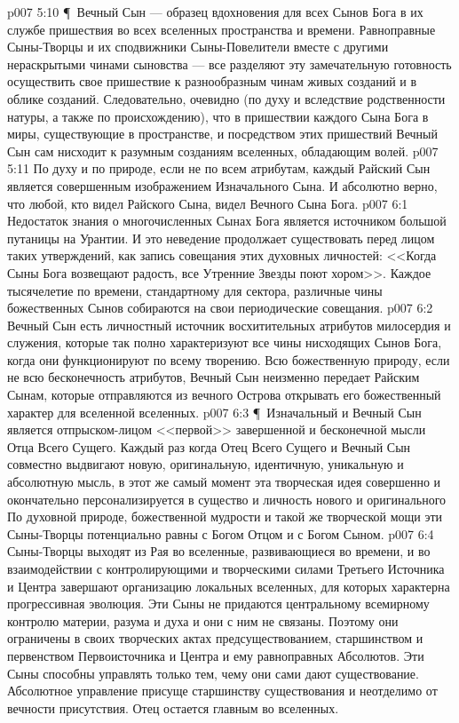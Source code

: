 \vs p007 5:10 \P\ Вечный Сын --- образец вдохновения для всех Сынов Бога в их службе пришествия во всех вселенных пространства и времени. Равноправные Сыны\hyp{}Творцы и их сподвижники Сыны\hyp{}Повелители вместе с другими нераскрытыми чинами сыновства --- все разделяют эту замечательную готовность осуществить свое пришествие к разнообразным чинам живых созданий и в облике созданий. Следовательно, очевидно (по духу и вследствие родственности натуры, а также по происхождению), что в пришествии каждого Сына Бога в миры, существующие в пространстве, и посредством этих пришествий Вечный Сын сам нисходит к разумным созданиям вселенных, обладающим волей.
\vs p007 5:11 По духу и по природе, если не по всем атрибутам, каждый Райский Сын является совершенным изображением Изначального Сына. И абсолютно верно, что любой, кто видел Райского Сына, видел Вечного Сына Бога.
\vs p007 6:1 Недостаток знания о многочисленных Сынах Бога является источником большой путаницы на Урантии. И это неведение продолжает существовать перед лицом таких утверждений, как запись совещания этих духовных личностей: <<Когда Сыны Бога возвещают радость, все Утренние Звезды поют хором>>. Каждое тысячелетие по времени, стандартному для сектора, различные чины божественных Сынов собираются на свои периодические совещания.
\vs p007 6:2 Вечный Сын есть личностный источник восхитительных атрибутов милосердия и служения, которые так полно характеризуют все чины нисходящих Сынов Бога, когда они функционируют по всему творению. Всю божественную природу, если не всю бесконечность атрибутов, Вечный Сын неизменно передает Райским Сынам, которые отправляются из вечного Острова открывать его божественный характер для вселенной вселенных.
\vs p007 6:3 \P\ Изначальный и Вечный Сын является отпрыском\hyp{}лицом <<первой>> завершенной и бесконечной мысли Отца Всего Сущего. Каждый раз когда Отец Всего Сущего и Вечный Сын совместно выдвигают новую, оригинальную, идентичную, уникальную и абсолютную мысль, в этот же самый момент эта творческая идея совершенно и окончательно персонализируется в существо и личность нового и оригинального  По духовной природе, божественной мудрости и такой же творческой мощи эти Сыны\hyp{}Творцы потенциально равны с Богом Отцом и с Богом Сыном.
\vs p007 6:4 Сыны\hyp{}Творцы выходят из Рая во вселенные, развивающиеся во времени, и во взаимодействии с контролирующими и творческими силами Третьего Источника и Центра завершают организацию локальных вселенных, для которых характерна прогрессивная эволюция. Эти Сыны не придаются центральному всемирному контролю материи, разума и духа и они с ним не связаны. Поэтому они ограничены в своих творческих актах предсуществованием, старшинством и первенством Первоисточника и Центра и ему равноправных Абсолютов. Эти Сыны способны управлять только тем, чему они сами дают существование. Абсолютное управление присуще старшинству существования и неотделимо от вечности присутствия. Отец остается главным во вселенных.
